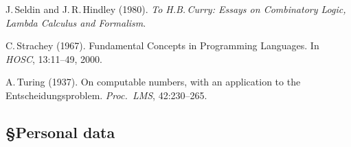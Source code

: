 \documentclass[11pt,twocolumn]{article}
\begin{document}
{\begin{thebibliography}{00}
J.\,Seldin and J.\,R.\,Hindley (1980).
\newblock \emph{To H.B.\,Curry: Essays on Combinatory Logic, Lambda
  Calculus and Formalism}.

C.\,Strachey (1967).
\newblock Fundamental Concepts in Programming Languages.  
\newblock In \emph{HOSC}, 13:11--49, 2000.

A.\,Turing (1937). 
\newblock On computable numbers, with an application to the
  Entscheidungsproblem. 
\newblock \emph{Proc.\ LMS}, 42:230--265.

\end{thebibliography}}

\clearpage
\setcounter{page}{1}

\subsection*{\S\enspace\thinspace Personal data}
\end{document}

